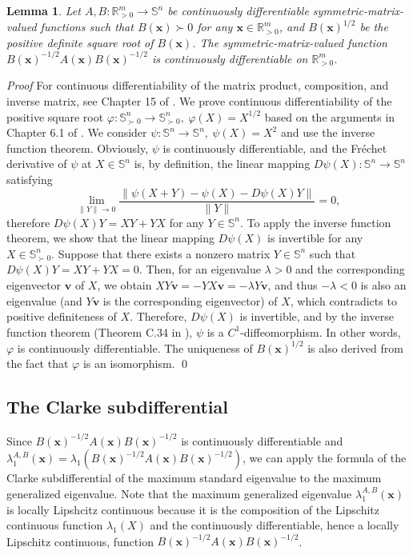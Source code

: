 \documentclass[sn-mathphys,Numbered]{sn-jnl}%
\theoremstyle{thmstyleone}%
\theoremstyle{thmstyletwo}%
\theoremstyle{thmstylethree}%
\newtheorem{lemma}[theorem]{Lemma}
\newcommand{\e}[1]{\begin{equation}#1\end{equation}}
\def\lamx{\lambda^{A,B}_1(\boldsymbol{x})}
\begin{document}
\begin{lemma}
Let $A,B:\mathbb{R}^m_{>0}\to\mathbb{S}^n$ be continuously differentiable symmetric-matrix-valued functions such that $B(\bm{x})\succ 0$ for any $\bm{x}\in\mathbb{R}^m_{>0}$, and $B(\bm{x})^{1/2}$ be the positive definite square root of $B(\bm{x})$. The symmetric-matrix-valued function $B(\bm{x})^{-1/2}A(\bm{x})B(\bm{x})^{-1/2}$ is continuously differentiable on $\mathbb{R}^m_{>0}$.
\label{lmm_dif}
\end{lemma}
{\it Proof }
For continuous differentiability of the matrix product, composition, and inverse matrix, see Chapter 15 of \cite{harville97}. We prove continuous differentiability of the positive square root $\varphi:\mathbb{S}^n_{\succ 0}\to\mathbb{S}^n_{\succ 0},\ \varphi(X)=X^{1/2}$ based on the arguments in Chapter 6.1 of \cite{higham08}. We consider $\psi:\mathbb{S}^n\to\mathbb{S}^n,\ \psi(X)=X^2$ and use the inverse function theorem. Obviously, $\psi$ is continuously differentiable, and the Fr\'{e}chet derivative of $\psi$ at $X\in\mathbb{S}^n$ is, by definition, the linear mapping $D\psi(X):\mathbb{S}^n\to\mathbb{S}^n$ satisfying
\e{
\underset{\|Y\|\to 0}\lim\frac{\|\psi(X+Y)-\psi(X)-D\psi(X)Y\|}{\|Y\|}=0,
}
therefore $D\psi(X)Y=XY+YX$ for any $Y\in\mathbb{S}^n$. To apply the inverse function theorem, we show that the linear mapping $D\psi(X)$ is invertible for any $X\in\mathbb{S}^n_{\succ 0}$. Suppose that there exists a nonzero matrix $Y\in\mathbb{S}^n$ such that $D\psi(X)Y=XY+YX=0$. Then, for an eigenvalue $\lambda>0$ and the corresponding eigenvector $\bm{v}$ of $X$, we obtain $XY\bm{v}=-YX\bm{v}=-\lambda Y\bm{v}$, and thus $-\lambda<0$ is also an eigenvalue (and $Y\bm{v}$ is the corresponding eigenvector) of $X$, which contradicts to positive definiteness of $X$. Therefore, $D\psi(X)$ is invertible, and by the inverse function theorem (Theorem C.34 in \cite{lee12}), $\psi$ is a $C^1$-diffeomorphism. In other words, $\varphi$ is continuously differentiable. The uniqueness of $B(\bm{x})^{1/2}$ is also derived from the fact that $\varphi$ is an isomorphism.
\qed

\subsection{The Clarke subdifferential}

Since $B(\bm{x})^{-1/2}A(\bm{x})B(\bm{x})^{-1/2}$ is continuously differentiable and $\lamx=\lambda_1(B(\bm{x})^{-1/2}A(\bm{x})B(\bm{x})^{-1/2})$, we can apply the formula of the Clarke subdifferential of the maximum standard eigenvalue \cite{overton92} to the maximum generalized eigenvalue. Note that the maximum generalized eigenvalue $\lamx$ is locally Lipshcitz continuous because it is the composition of the Lipschitz continuous function $\lambda_1(X)$ \cite{beck17} and the continuously differentiable, hence a locally Lipschitz continuous, function $B(\bm{x})^{-1/2}A(\bm{x})B(\bm{x})^{-1/2}$.
\end{document}
